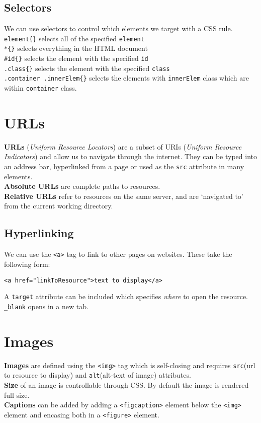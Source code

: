 \documentclass[a4paper,11pt]{article}
\begin{document}
\subsection{Selectors}
We can use selectors to control which elements we target with a CSS rule. \\
\verb|element{}| selects all of the specified \verb|element|\\
\verb|*{}| selects everything in the HTML document\\
\verb|#id{}| selects the element with the specified \verb|id|\\
\verb|.class{}| selects the element with the specified \verb|class|\\
\verb|.container .innerElem{}| selects the elements with \verb|innerElem| class which are within \verb|container| class.

\section{URLs}
\textbf{URLs} (\textit{Uniform Resource Locators}) are a subset of URIs (\textit{Uniform Resource Indicators}) and allow us to navigate through the internet. They can be typed into an address bar, hyperlinked from a page or used as the \verb|src| attribute in many elements.\\
\textbf{Absolute URLs} are complete paths to resources.\\
\textbf{Relative URLs} refer to resources on the same server, and are `navigated to' from the current working directory.

\subsection{Hyperlinking}
We can use the \verb|<a>| tag to link to other pages on websites. These take the following form:
\begin{verbatim}
<a href="linkToResource">text to display</a>
\end{verbatim}
A \verb|target| attribute can be included which specifies \textit{where} to open the resource. \verb|_blank| opens in a new tab. 

\section{Images}
\textbf{Images} are defined using the \verb|<img>| tag which is self-closing and requires \verb|src|(url to resource to display) and \verb|alt|(alt-text of image) attributes.\\
\textbf{Size} of an image is controllable through CSS. By default the image is rendered full size. \\
\textbf{Captions} can be added by adding a \verb|<figcaption>| element below the \verb|<img>| element and encasing both in a \verb|<figure>| element.
\end{document}
